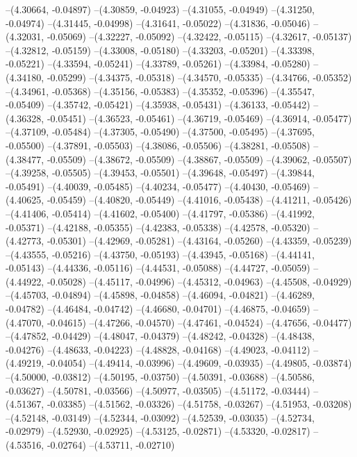 --(4.30664, -0.04897)
--(4.30859, -0.04923)
--(4.31055, -0.04949)
--(4.31250, -0.04974)
--(4.31445, -0.04998)
--(4.31641, -0.05022)
--(4.31836, -0.05046)
--(4.32031, -0.05069)
--(4.32227, -0.05092)
--(4.32422, -0.05115)
--(4.32617, -0.05137)
--(4.32812, -0.05159)
--(4.33008, -0.05180)
--(4.33203, -0.05201)
--(4.33398, -0.05221)
--(4.33594, -0.05241)
--(4.33789, -0.05261)
--(4.33984, -0.05280)
--(4.34180, -0.05299)
--(4.34375, -0.05318)
--(4.34570, -0.05335)
--(4.34766, -0.05352)
--(4.34961, -0.05368)
--(4.35156, -0.05383)
--(4.35352, -0.05396)
--(4.35547, -0.05409)
--(4.35742, -0.05421)
--(4.35938, -0.05431)
--(4.36133, -0.05442)
--(4.36328, -0.05451)
--(4.36523, -0.05461)
--(4.36719, -0.05469)
--(4.36914, -0.05477)
--(4.37109, -0.05484)
--(4.37305, -0.05490)
--(4.37500, -0.05495)
--(4.37695, -0.05500)
--(4.37891, -0.05503)
--(4.38086, -0.05506)
--(4.38281, -0.05508)
--(4.38477, -0.05509)
--(4.38672, -0.05509)
--(4.38867, -0.05509)
--(4.39062, -0.05507)
--(4.39258, -0.05505)
--(4.39453, -0.05501)
--(4.39648, -0.05497)
--(4.39844, -0.05491)
--(4.40039, -0.05485)
--(4.40234, -0.05477)
--(4.40430, -0.05469)
--(4.40625, -0.05459)
--(4.40820, -0.05449)
--(4.41016, -0.05438)
--(4.41211, -0.05426)
--(4.41406, -0.05414)
--(4.41602, -0.05400)
--(4.41797, -0.05386)
--(4.41992, -0.05371)
--(4.42188, -0.05355)
--(4.42383, -0.05338)
--(4.42578, -0.05320)
--(4.42773, -0.05301)
--(4.42969, -0.05281)
--(4.43164, -0.05260)
--(4.43359, -0.05239)
--(4.43555, -0.05216)
--(4.43750, -0.05193)
--(4.43945, -0.05168)
--(4.44141, -0.05143)
--(4.44336, -0.05116)
--(4.44531, -0.05088)
--(4.44727, -0.05059)
--(4.44922, -0.05028)
--(4.45117, -0.04996)
--(4.45312, -0.04963)
--(4.45508, -0.04929)
--(4.45703, -0.04894)
--(4.45898, -0.04858)
--(4.46094, -0.04821)
--(4.46289, -0.04782)
--(4.46484, -0.04742)
--(4.46680, -0.04701)
--(4.46875, -0.04659)
--(4.47070, -0.04615)
--(4.47266, -0.04570)
--(4.47461, -0.04524)
--(4.47656, -0.04477)
--(4.47852, -0.04429)
--(4.48047, -0.04379)
--(4.48242, -0.04328)
--(4.48438, -0.04276)
--(4.48633, -0.04223)
--(4.48828, -0.04168)
--(4.49023, -0.04112)
--(4.49219, -0.04054)
--(4.49414, -0.03996)
--(4.49609, -0.03935)
--(4.49805, -0.03874)
--(4.50000, -0.03812)
--(4.50195, -0.03750)
--(4.50391, -0.03688)
--(4.50586, -0.03627)
--(4.50781, -0.03566)
--(4.50977, -0.03505)
--(4.51172, -0.03444)
--(4.51367, -0.03385)
--(4.51562, -0.03326)
--(4.51758, -0.03267)
--(4.51953, -0.03208)
--(4.52148, -0.03149)
--(4.52344, -0.03092)
--(4.52539, -0.03035)
--(4.52734, -0.02979)
--(4.52930, -0.02925)
--(4.53125, -0.02871)
--(4.53320, -0.02817)
--(4.53516, -0.02764)
--(4.53711, -0.02710)
